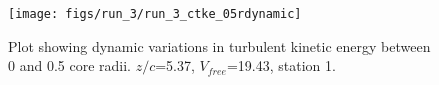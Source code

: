 \begin{figure}[H]
\centering
\texttt{[image: figs/run\_3/run\_3\_ctke\_05rdynamic]}
\caption{Plot showing dynamic variations in turbulent kinetic energy between 0 and 0.5 core radii. $z/c$=5.37, $V_{free}$=19.43, station 1.}
\label{fig:run_3_ctke_05rdynamic}
\end{figure}


